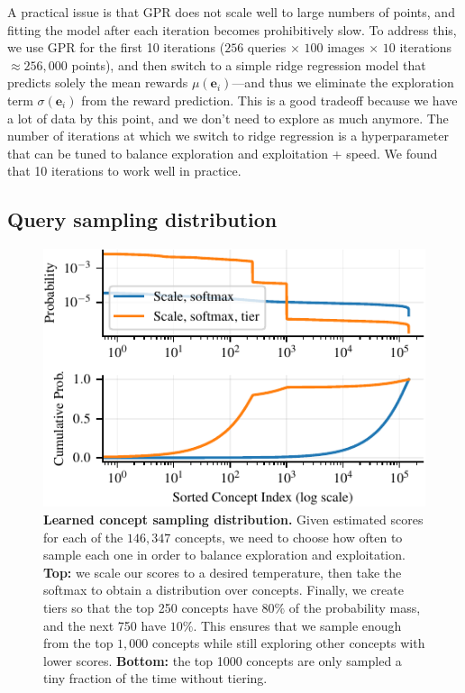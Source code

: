 
A practical issue is that GPR does not scale well to large numbers of points, and fitting the model after each iteration becomes prohibitively slow. To address this, we use GPR for the first 10 iterations ($256$ queries $\times$ $100$ images $\times$ $10$ iterations $\approx 256{,}000$ points), and then switch to a simple ridge regression model that predicts solely the mean rewards $\mu(\mathbf{e}_i)$---and thus we eliminate the exploration term $\sigma(\mathbf{e}_i)$ from the reward prediction. This is a good tradeoff because we have a lot of data by this point, and we don't need to explore as much anymore.
The number of iterations at which we switch to ridge regression is a hyperparameter that can be tuned to balance exploration and exploitation + speed. We found that 10 iterations to work well in practice.


\subsection{Query sampling distribution}
\label{subsec:tiering}

\begin{figure}[t]
    \centering
    \includegraphics[width=0.7\linewidth]{figures/sampling_dist_shorter.pdf}
    \caption{\textbf{Learned concept sampling distribution.} Given estimated scores for each of the $146{,}347$ concepts, we need to choose how often to sample each one in order to balance exploration and exploitation.
    \textbf{Top:} we scale our scores to a desired temperature, then take the softmax to obtain a distribution over concepts. Finally, we create tiers so that the top 250 concepts have $80\%$ of the probability mass, and the next 750 have $10\%$. This ensures that we sample enough from the top $1{,}000$ concepts while still exploring other concepts with lower scores.
    \textbf{Bottom:} the top 1000 concepts are only sampled a tiny fraction of the time without tiering.}
    \label{fig:sampling_dist}
    \vspace{-0.12in}
\end{figure}

